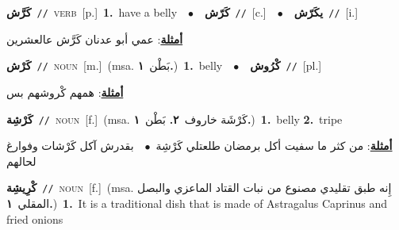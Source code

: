 \documentclass[10pt,a4paper,twoside]{article} %
\begin{document}
\begin{multicols}{2}
{\setlength\topsep{0pt}\textbf{\foreignlanguage{arabic}{كَرَّش}}\ {\color{gray}\texttt{//}\color{black}}\ \textsc{verb}\ [p.]\ \textbf{1.}~have a belly\ \ $\bullet$\ \ \setlength\topsep{0pt}\textbf{\foreignlanguage{arabic}{كَرّش}}\ {\color{gray}\texttt{//}\color{black}}\ [c.]\ \ $\bullet$\ \ \setlength\topsep{0pt}\textbf{\foreignlanguage{arabic}{يكَرّش}}\ {\color{gray}\texttt{//}\color{black}}\ [i.]\  \begin{flushright}\color{gray}\foreignlanguage{arabic}{\textbf{\underline{\foreignlanguage{arabic}{أمثلة}}}: عمي أبو عدنان كَرَّش عالعشرين}\end{flushright}\color{black}} \vspace{2mm}

{\setlength\topsep{0pt}\textbf{\foreignlanguage{arabic}{كَرْش}}\ {\color{gray}\texttt{//}\color{black}}\ \textsc{noun}\ [m.]\ \color{gray}(msa. \foreignlanguage{arabic}{بَطْن}~\foreignlanguage{arabic}{\textbf{١.}})\color{black}\ \textbf{1.}~belly\ \ $\bullet$\ \ \setlength\topsep{0pt}\textbf{\foreignlanguage{arabic}{كْرُوش}}\ {\color{gray}\texttt{//}\color{black}}\ [pl.]\  \begin{flushright}\color{gray}\foreignlanguage{arabic}{\textbf{\underline{\foreignlanguage{arabic}{أمثلة}}}: همهم كْروشهم بس}\end{flushright}\color{black}} \vspace{2mm}

{\setlength\topsep{0pt}\textbf{\foreignlanguage{arabic}{كَرْشِة}}\ {\color{gray}\texttt{//}\color{black}}\ \textsc{noun}\ [f.]\ \color{gray}(msa. \foreignlanguage{arabic}{كَرْشَة خاروف}~\foreignlanguage{arabic}{\textbf{٢.}}  \foreignlanguage{arabic}{بَطْن}~\foreignlanguage{arabic}{\textbf{١.}})\color{black}\ \textbf{1.}~belly  \textbf{2.}~tripe\  \begin{flushright}\color{gray}\foreignlanguage{arabic}{\textbf{\underline{\foreignlanguage{arabic}{أمثلة}}}: من كثر ما سفيت أكل برمضان طلعتلي كَرْشِة\ $\bullet$\ \  بقدرش آكل كَرْشات وفوارغ لحالهم}\end{flushright}\color{black}} \vspace{2mm}

{\setlength\topsep{0pt}\textbf{\foreignlanguage{arabic}{كْرِيشِة}}\ {\color{gray}\texttt{//}\color{black}}\ \textsc{noun}\ [f.]\ \color{gray}(msa. \foreignlanguage{arabic}{إِنه طبق تقليدي مصنوع من نبات القتاد الماعزي والبصل المقلي}~\foreignlanguage{arabic}{\textbf{١.}})\color{black}\ \textbf{1.}~It is a traditional dish that is made of Astragalus Caprinus and fried onions\ } \vspace{2mm}


\end{multicols}
\end{document}
